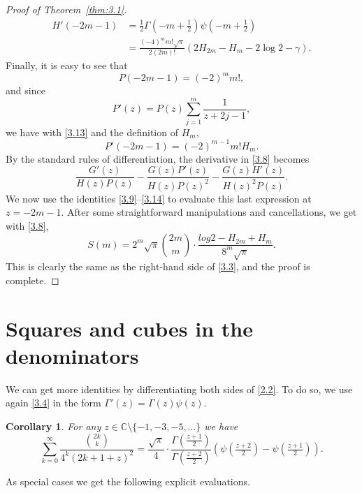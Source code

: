 \documentclass{amsart}
\newtheorem{corollary}[theorem]{Corollary}
\theoremstyle{definition}
\theoremstyle{remark}
\numberwithin{equation}{section}
\begin{document}
\begin{proof}[Proof of Theorem~\ref{thm:3.1}]
\begin{align}
H'(-2m-1) 
&= \frac{1}{2}\Gamma(-m+\tfrac{1}{2})\psi(-m+\tfrac{1}{2})\label{3.12} \\
&= \frac{(-4)^m m!\sqrt{\pi}}{2(2m)!}\left(2H_{2m}-H_m-2\log{2}-\gamma\right).
\nonumber
\end{align}
Finally, it is easy to see that
\begin{equation}\label{3.13}
P(-2m-1) = (-2)^m m!,
\end{equation}
and since
\[
P'(z) = P(z)\sum_{j=1}^m\frac{1}{z+2j-1},
\]
we have with \eqref{3.13} and the definition of $H_m$,
\begin{equation}\label{3.14}
P'(-2m-1) = (-2)^{m-1}m!H_m.
\end{equation}
By the standard rules of differentiation, the derivative in \eqref{3.8} becomes
\[
\frac{G'(z)}{H(z)P(z)}-\frac{G(z)P'(z)}{H(z)P(z)^2}
-\frac{G(z)H'(z)}{H(z)^2P(z)}.
\]
We now use the identities \eqref{3.9}--\eqref{3.14} to evaluate this last 
expression at $z=-2m-1$. After some straightforward manipulations and
cancellations, we get with \eqref{3.8},
\[
S(m)=2^m\sqrt{\pi}\binom{2m}{m}
\cdot\frac{log{2}-H_{2m}+H_m}{8^m\sqrt{\pi}}.
\]
This is clearly the same as the right-hand side of \eqref{3.3}, and the proof
is complete.
\end{proof}

\section{Squares and cubes in the denominators}\label{sec:4}

We can get more identities by differentiating both sides of \eqref{2.2}.
To do so, we use again \eqref{3.4} in the form $\Gamma'(z)=\Gamma(z)\psi(z)$.

\begin{corollary}\label{cor:4.1}
For any $z\in{\mathbb C}\setminus\{-1,-3,-5,\ldots\}$ we have
\begin{equation}\label{4.1}
\sum_{k=0}^\infty\frac{\binom{2k}{k}}{4^k(2k+1+z)^2}
=\frac{\sqrt{\pi}}{4}\cdot\frac{\Gamma(\frac{z+1}{2})}{\Gamma(\frac{z+2}{2})}
\left(\psi(\tfrac{z+2}{2})-\psi(\tfrac{z+1}{2})\right).
\end{equation}
\end{corollary}

As special cases we get the following explicit evaluations.
\end{document}
